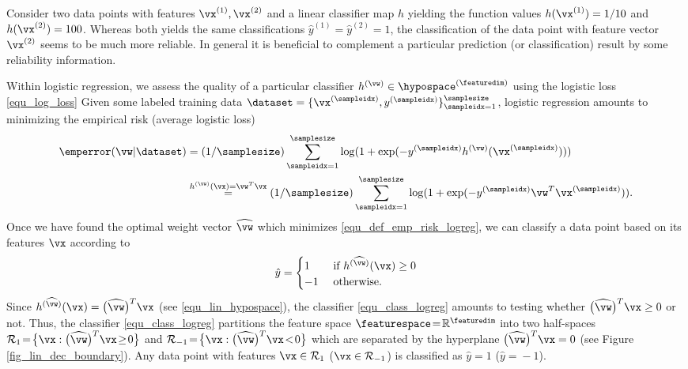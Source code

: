 \documentclass[12pt]{report}
\begin{document}
Consider two data points with features $\vx^{(1)}, \vx^{(2)}$ and a linear classifier map $h$ yielding 
the function values $h(\vx^{(1)}) = 1/10$ and $h(\vx^{(2)}) = 100$. Whereas both yields the same 
classifications $\hat{y}^{(1)}\!=\!\hat{y}^{(2)}\!=\!1$, the classification of the data point with feature 
vector $\vx^{(2)}$ seems to be much more reliable. In general it is beneficial to complement a particular 
prediction (or classification) result by some reliability information. 

Within logistic regression, we assess the quality of a particular classifier $h^{(\vw)} \in \hypospace^{(\featuredim)}$ 
using the logistic loss \eqref{equ_log_loss} Given some labeled training data $\dataset =\{ \vx^{(\sampleidx)},y^{(\sampleidx)} \}_{\sampleidx=1}^{\samplesize}$, logistic regression amounts to minimizing the empirical risk (average logistic loss) 
\begin{align} 
\label{equ_def_emp_risk_logreg}
\emperror ( \vw | \dataset ) & = (1/\samplesize) \sum_{\sampleidx=1}^{\samplesize}  \log( 1+ \exp ( - y^{(\sampleidx)} h^{(\vw)}(\vx^{(\sampleidx)}))) \nonumber \\
& \stackrel{h^{(\vw)}(\vx)=\vw^{T} \vx}{=}  (1/\samplesize) \sum_{\sampleidx=1}^{\samplesize} \log( 1+ \exp ( - y^{(\sampleidx)} \vw^{T} \vx^{(\sampleidx)})).
\end{align} 
Once we have found the optimal weight vector $\widehat{\vw}$ which minimizes \eqref{equ_def_emp_risk_logreg}, 
we can classify a data point based on its features $\vx$ according to 
\begin{equation}
\label{equ_class_logreg}
\hat{y} =  \begin{cases} 1 & \mbox{ if } h^{(\widehat{\vw})}(\vx) \geq 0 \\ -1 & \mbox{ otherwise.} \end{cases}
\end{equation} 
Since $h^{(\widehat{\vw})}(\vx) = \big(\widehat{\vw}\big)^{T} \vx$ (see \eqref{equ_lin_hypospace}), 
the classifier \eqref{equ_class_logreg} amounts to testing whether $\big(\widehat{\vw}\big)^{T} \vx \geq 0$ 
or not. Thus, the classifier \eqref{equ_class_logreg} partitions the feature space $\featurespace\!=\!\mathbb{R}^{\featuredim}$ 
into two half-spaces $\mathcal{R}_{1}\!=\!\big\{ \vx: \big(\widehat{\vw}\big)^{T} \vx\!\geq\!0 \big\}$ and 
$\mathcal{R}_{-1}\!=\!\big\{ \vx: \big(\widehat{\vw}\big)^{T} \vx\!<\!0 \big\}$ which are separated by the 
hyperplane $\big(\widehat{\vw}\big)^{T} \vx =0$ (see Figure \ref{fig_lin_dec_boundary}). Any data point 
with features $\vx \in \mathcal{R}_{1}$ ($\vx \in \mathcal{R}_{-1}$) is classified as $\hat{y}\!=\!1$ ($\hat{y}\!=\!-1$). 
\end{document}

